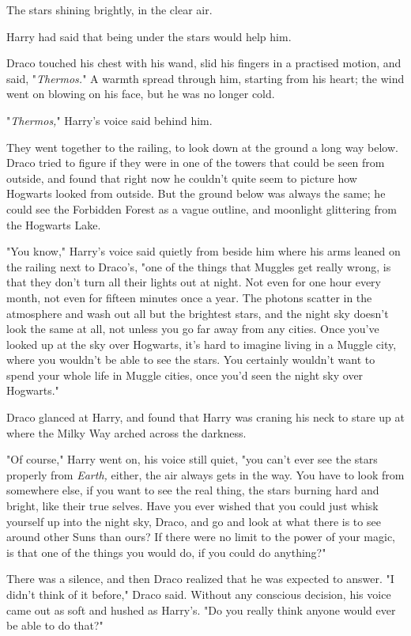 The stars shining brightly, in the clear air.

Harry had said that being under the stars would help him.

Draco touched his chest with his wand, slid his fingers in a practised motion,
and said, "\emph{Thermos.}" A warmth spread through him, starting from his
heart; the wind went on blowing on his face, but he was no longer cold.

"\emph{Thermos,}" Harry’s voice said behind him.

They went together to the railing, to look down at the ground a long way below.
Draco tried to figure if they were in one of the towers that could be seen from
outside, and found that right now he couldn’t quite seem to picture how
Hogwarts looked from outside. But the ground below was always the same; he
could see the Forbidden Forest as a vague outline, and moonlight glittering
from the Hogwarts Lake.

"You know," Harry’s voice said quietly from beside him where his arms leaned on
the railing next to Draco’s, "one of the things that Muggles get really wrong,
is that they don’t turn all their lights out at night. Not even for one hour
every month, not even for fifteen minutes once a year. The photons scatter in
the atmosphere and wash out all but the brightest stars, and the night sky
doesn’t look the same at all, not unless you go far away from any cities. Once
you’ve looked up at the sky over Hogwarts, it’s hard to imagine living in a
Muggle city, where you wouldn’t be able to see the stars. You certainly
wouldn’t want to spend your whole life in Muggle cities, once you’d seen the
night sky over Hogwarts."

Draco glanced at Harry, and found that Harry was craning his neck to stare up
at where the Milky Way arched across the darkness.

"Of course," Harry went on, his voice still quiet, "you can’t ever see the
stars properly from \emph{Earth,} either, the air always gets in the way. You
have to look from somewhere else, if you want to see the real thing, the stars
burning hard and bright, like their true selves. Have you ever wished that you
could just whisk yourself up into the night sky, Draco, and go and look at what
there is to see around other Suns than ours? If there were no limit to the
power of your magic, is that one of the things you would do, if you could do
anything?"

There was a silence, and then Draco realized that he was expected to answer. "I
didn’t think of it before," Draco said. Without any conscious decision, his
voice came out as soft and hushed as Harry’s. "Do you really think anyone would
ever be able to do that?"

